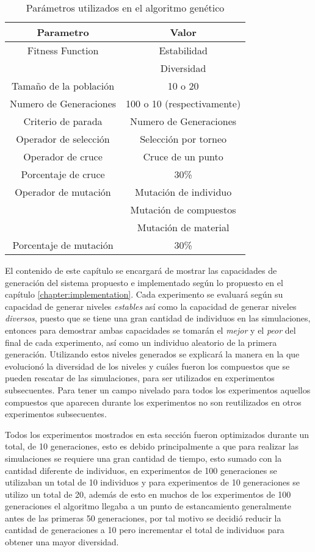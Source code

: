 \begin{table}[ht]
  \caption{Parámetros utilizados en el algoritmo genético}
  \label{table:parametros_ga}
  \centering
  \begin{tabular}{|c|c|}
  \hline
  Parametro & Valor \\
  \hline
  \hline
  Fitness Function & Estabilidad \\ & Diversidad \\
  \hline
  Tamaño de la población & 10 o 20 \\
  \hline
  Numero de Generaciones & 100 o 10 (respectivamente) \\
  \hline
  Criterio de parada & Numero de Generaciones \\
  \hline
  Operador de selección & Selección por torneo \\
  \hline
  Operador de cruce & Cruce de un punto \\
  \hline
  Porcentaje de cruce & 30\% \\
  \hline
  Operador de mutación & Mutación de individuo \\ & Mutación de compuestos \\ & Mutación de material \\
  \hline
  Porcentaje de mutación & 30\% \\
  \hline
  \end{tabular}
\end{table}

El contenido de este capítulo se encargará de mostrar las capacidades de
generación del sistema propuesto e implementado según lo propuesto en el capítulo
\ref{chapter:implementation}.
Cada experimento se evaluará según su capacidad de
generar niveles \textit{estables} así como la capacidad de generar
niveles \textit{diversos}, puesto que se tiene una gran cantidad de individuos
en las simulaciones, entonces para demostrar ambas capacidades se tomarán el
\textit{mejor} y el \textit{peor} del final de cada experimento, así como un
individuo aleatorio de la primera generación. Utilizando estos niveles generados
se explicará la manera en la que evolucionó la diversidad de los niveles y
cuáles fueron los compuestos que se pueden rescatar de las simulaciones, para ser
utilizados en experimentos subsecuentes. Para tener un campo nivelado para todos
los experimentos aquellos compuestos que aparecen durante los experimentos no
son reutilizados en otros experimentos subsecuentes.

Todos los experimentos mostrados en esta sección fueron optimizados durante un
total, de 10 generaciones, esto es debido principalmente a que para realizar las
simulaciones se requiere una gran cantidad de tiempo, esto sumado con la
cantidad diferente de individuos, en experimentos de 100 generaciones se
utilizaban un total de 10 individuos y para experimentos de 10 generaciones se
utilizo un total de 20, además de esto en muchos de los experimentos de 100
generaciones el algoritmo llegaba a un punto de estancamiento generalmente antes
de las primeras 50 generaciones, por tal motivo se decidió reducir la cantidad
de generaciones a 10 pero incrementar el total de individuos para obtener una
mayor diversidad.

